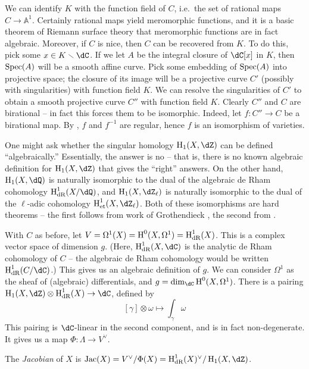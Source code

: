 \documentclass{article}
\begin{document}
\begin{remark}
We can identify $K$ with the function field of $C$, i.e.\ the set of rational 
maps $C\to\mathbb{A}^1$. Certainly rational maps yield meromorphic functions, 
and it is a basic theorem of Riemann surface theory that meromorphic functions 
are in fact algebraic. Moreover, if $C$ is nice, then $C$ can be recovered 
from $K$. To do this, pick some $x\in K\smallsetminus \dC$. If we let $A$ be 
the integral closure of $\dC[x]$ in $K$, then $\operatorname{Spec}(A)$ will be a 
smooth affine curve. Pick some embedding of $\operatorname{Spec}(A)$ into projective space; 
the closure of its image will be a projective curve $C'$ (possibly with 
singularities) with function field $K$. We can resolve the singularities of 
$C'$ to obtain a smooth projective curve $C''$ with function field $K$. 
Clearly $C''$ and $C$ are birational -- in fact this forces them to be 
isomorphic. Indeed, let $f:C''\to C$ be a birational map. By 
\cite[thm 3.1]{mi}, $f$ and $f^{-1}$ are regular, hence $f$ is an 
isomorphism of varieties. 
\end{remark}

One might ask whether the singular homology $\h_1(X,\dZ)$ can be 
defined ``algebraically.'' Essentially, the answer is no -- that is, there is 
no known algebraic definition for $\h_1(X,\dZ)$ that gives the 
``right'' answers. On the other hand, $\h_1(X,\dQ)$ is naturally 
isomorphic to the dual of the algebraic de Rham cohomology 
$\h_\text{dR}^1(X/\dQ)$, and $\h_1(X,\dZ_\ell)$ is naturally 
isomorphic to the dual of the $\ell$-adic cohomology 
$\h_\text{et}^1(X,\dZ_\ell)$. Both of these isomorphisms are hard 
theorems -- the first follows from work of Grothendieck \cite{gr66}, the 
second from \cite[I 4.6.3]{de77}. 

With $C$ as before, let $V=\Omega^1(X)=\operatorname{H}^0(X,\Omega^1)=\operatorname{H}^1_\text{dR}(X)$. 
This is a complex vector space of dimension $g$. (Here, $\h_\text{dR}^1(X,\dC)$ 
is the analytic de Rham cohomology of $C$ -- the algebraic de Rham cohomology 
would be written $\h_\text{dR}^1(C/\dC)$.) This gives us an algebraic 
definition of $g$. We can consider $\Omega^1$ as the sheaf of (algebraic) 
differentials, and $g=\dim_\dC\h^0(X,\Omega^1)$. There is a pairing 
$\h_1(X,\dZ)\otimes\h_\text{dR}^1(X)\to\dC$, defined by 
\[
  [\gamma]\otimes \omega \mapsto \int_\gamma \omega
\]
This pairing is $\dC$-linear in the second component, and is in fact 
non-degenerate. It gives us a map $\Phi:\Lambda\to V^\vee$. 

\begin{definition}[analytic]
The \emph{Jacobian} of $X$ is 
$\jac(X)=V^\vee/\Phi(X) = \h_\textnormal{dR}^1(X)^\vee/\h_1(X,\dZ)$. 
\end{definition}
\end{document}
